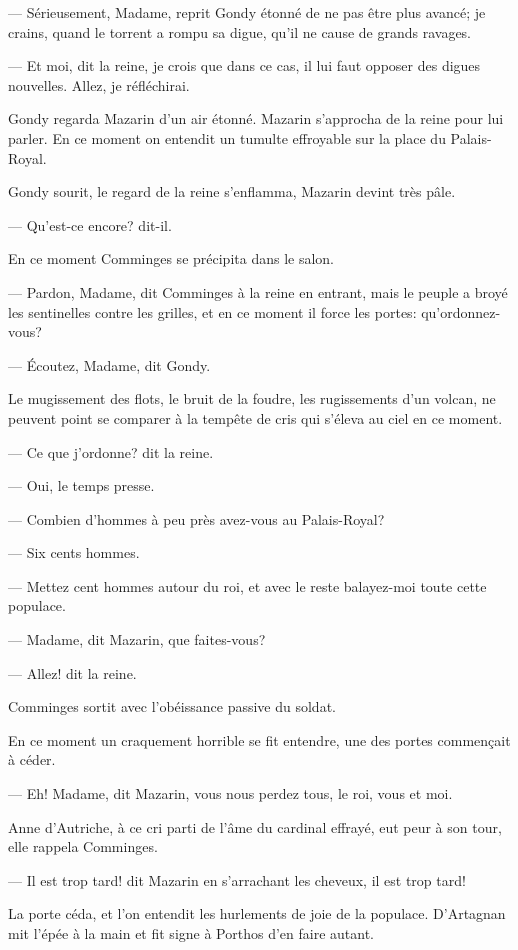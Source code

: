 — Sérieusement, Madame, reprit Gondy étonné de ne pas être plus avancé; je crains, quand le torrent a rompu sa digue, qu'il ne cause de grands ravages.

— Et moi, dit la reine, je crois que dans ce cas, il lui faut opposer des digues nouvelles. Allez, je réfléchirai.

Gondy regarda Mazarin d'un air étonné. Mazarin s'approcha de la reine pour lui parler. En ce moment on entendit un tumulte effroyable sur la place du Palais-Royal.

Gondy sourit, le regard de la reine s'enflamma, Mazarin devint très pâle.

— Qu'est-ce encore? dit-il.

En ce moment Comminges se précipita dans le salon.

— Pardon, Madame, dit Comminges à la reine en entrant, mais le peuple a broyé les sentinelles contre les grilles, et en ce moment il force les portes: qu'ordonnez-vous?

— Écoutez, Madame, dit Gondy.

Le mugissement des flots, le bruit de la foudre, les rugissements d'un volcan, ne peuvent point se comparer à la tempête de cris qui s'éleva au ciel en ce moment.

— Ce que j'ordonne? dit la reine.

— Oui, le temps presse.

— Combien d'hommes à peu près avez-vous au Palais-Royal?

— Six cents hommes.

— Mettez cent hommes autour du roi, et avec le reste balayez-moi toute cette populace.

— Madame, dit Mazarin, que faites-vous?

— Allez! dit la reine.

Comminges sortit avec l'obéissance passive du soldat.

En ce moment un craquement horrible se fit entendre, une des portes commençait à céder.

— Eh! Madame, dit Mazarin, vous nous perdez tous, le roi, vous et moi.

Anne d'Autriche, à ce cri parti de l'âme du cardinal effrayé, eut peur à son tour, elle rappela Comminges.

— Il est trop tard! dit Mazarin en s'arrachant les cheveux, il est trop tard!

La porte céda, et l'on entendit les hurlements de joie de la populace. D'Artagnan mit l'épée à la main et fit signe à Porthos d'en faire autant.

